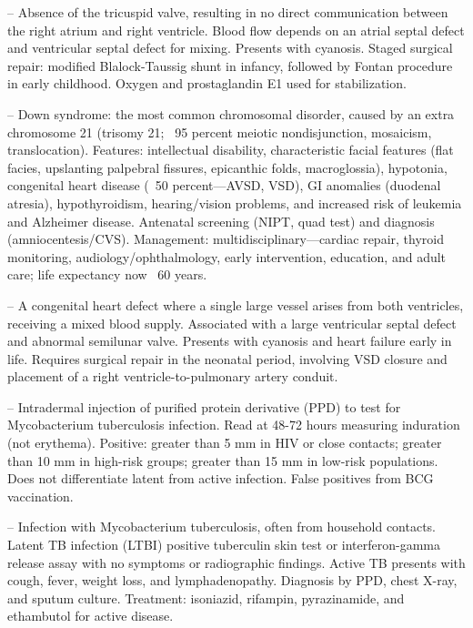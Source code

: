 -- Absence of the tricuspid valve, resulting in no direct communication between the right atrium and right ventricle. Blood flow depends on an atrial septal defect and ventricular septal defect for mixing. Presents with cyanosis. Staged surgical repair: modified Blalock-Taussig shunt in infancy, followed by Fontan procedure in early childhood. Oxygen and prostaglandin E1 used for stabilization.

-- Down syndrome: the most common chromosomal disorder, caused by an extra chromosome 21 (trisomy 21; ~95 percent meiotic nondisjunction, mosaicism, translocation). Features: intellectual disability, characteristic facial features (flat facies, upslanting palpebral fissures, epicanthic folds, macroglossia), hypotonia, congenital heart disease (~50 percent—AVSD, VSD), GI anomalies (duodenal atresia), hypothyroidism, hearing/vision problems, and increased risk of leukemia and Alzheimer disease. Antenatal screening (NIPT, quad test) and diagnosis (amniocentesis/CVS). Management: multidisciplinary—cardiac repair, thyroid monitoring, audiology/ophthalmology, early intervention, education, and adult care; life expectancy now ~60 years.

-- A congenital heart defect where a single large vessel arises from both ventricles, receiving a mixed blood supply. Associated with a large ventricular septal defect and abnormal semilunar valve. Presents with cyanosis and heart failure early in life. Requires surgical repair in the neonatal period, involving VSD closure and placement of a right ventricle-to-pulmonary artery conduit.

-- Intradermal injection of purified protein derivative (PPD) to test for Mycobacterium tuberculosis infection. Read at 48-72 hours measuring induration (not erythema). Positive: greater than 5 mm in HIV or close contacts; greater than 10 mm in high-risk groups; greater than 15 mm in low-risk populations. Does not differentiate latent from active infection. False positives from BCG vaccination.

-- Infection with Mycobacterium tuberculosis, often from household contacts. Latent TB infection (LTBI) positive tuberculin skin test or interferon-gamma release assay with no symptoms or radiographic findings. Active TB presents with cough, fever, weight loss, and lymphadenopathy. Diagnosis by PPD, chest X-ray, and sputum culture. Treatment: isoniazid, rifampin, pyrazinamide, and ethambutol for active disease.

